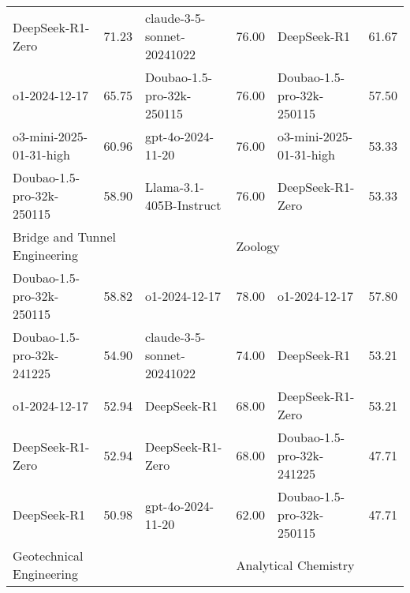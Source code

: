 {\begin{longtable}{p{4.2cm}>{\centering\arraybackslash} p{0.8cm}|p{4.2cm} >{\centering\arraybackslash} p{0.8cm}|p{4.2cm} >{\centering\arraybackslash} p{0.8cm}}
\cellcolor{blue!5} DeepSeek-R1-Zero & \cellcolor{blue!2}71.23 & \cellcolor{red!5} claude-3-5-sonnet-20241022 & \cellcolor{red!2} 76.00 & \cellcolor{green!5} DeepSeek-R1 & \cellcolor{green!2} 61.67\\
\cellcolor{blue!5} o1-2024-12-17 & \cellcolor{blue!2}65.75 & \cellcolor{red!5} Doubao-1.5-pro-32k-250115 & \cellcolor{red!2} 76.00 & \cellcolor{green!5} Doubao-1.5-pro-32k-250115 & \cellcolor{green!2} 57.50\\
\cellcolor{blue!5} o3-mini-2025-01-31-high & \cellcolor{blue!2}60.96 & \cellcolor{red!5} gpt-4o-2024-11-20 & \cellcolor{red!2} 76.00 & \cellcolor{green!5} o3-mini-2025-01-31-high & \cellcolor{green!2} 53.33\\
\cellcolor{blue!5} Doubao-1.5-pro-32k-250115 & \cellcolor{blue!2}58.90 & \cellcolor{red!5} Llama-3.1-405B-Instruct & \cellcolor{red!2} 76.00 & \cellcolor{green!5} DeepSeek-R1-Zero & \cellcolor{green!2} 53.33\\
\hline
\multicolumn{2}{p{5.15cm}|}{\cellcolor{blue!10} \centering Bridge and Tunnel Engineering} & \multicolumn{2}{p{5.15cm}|}{\cellcolor{red!10} \centering Procedural Law} & \multicolumn{2}{p{5.15cm}}{\cellcolor{green!10} \centering Zoology}\\
\hline
\cellcolor{blue!5} Doubao-1.5-pro-32k-250115 & \cellcolor{blue!2}58.82 & \cellcolor{red!5} o1-2024-12-17 & \cellcolor{red!2} 78.00 & \cellcolor{green!5} o1-2024-12-17 & \cellcolor{green!2} 57.80\\
\cellcolor{blue!5} Doubao-1.5-pro-32k-241225 & \cellcolor{blue!2}54.90 & \cellcolor{red!5} claude-3-5-sonnet-20241022 & \cellcolor{red!2} 74.00 & \cellcolor{green!5} DeepSeek-R1 & \cellcolor{green!2} 53.21\\
\cellcolor{blue!5} o1-2024-12-17 & \cellcolor{blue!2}52.94 & \cellcolor{red!5} DeepSeek-R1 & \cellcolor{red!2} 68.00 & \cellcolor{green!5} DeepSeek-R1-Zero & \cellcolor{green!2} 53.21\\
\cellcolor{blue!5} DeepSeek-R1-Zero & \cellcolor{blue!2}52.94 & \cellcolor{red!5} DeepSeek-R1-Zero & \cellcolor{red!2} 68.00 & \cellcolor{green!5} Doubao-1.5-pro-32k-241225 & \cellcolor{green!2} 47.71\\
\cellcolor{blue!5} DeepSeek-R1 & \cellcolor{blue!2}50.98 & \cellcolor{red!5} gpt-4o-2024-11-20 & \cellcolor{red!2} 62.00 & \cellcolor{green!5} Doubao-1.5-pro-32k-250115 & \cellcolor{green!2} 47.71\\
\hline
\multicolumn{2}{p{5.15cm}|}{\cellcolor{blue!10} \centering Geotechnical Engineering} & \multicolumn{2}{p{5.15cm}|}{\cellcolor{red!10} \centering Political Science} & \multicolumn{2}{p{5.15cm}}{\cellcolor{green!10} \centering Analytical Chemistry}\\

\end{longtable}}
